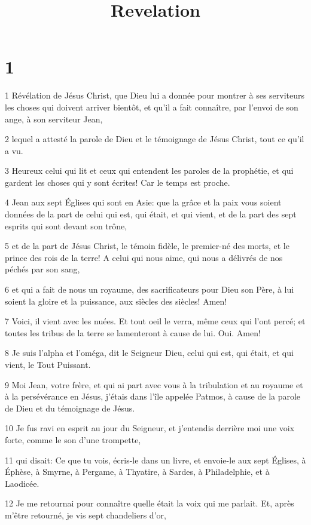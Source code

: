

\title{Revelation}


\chapter{1}

\par 1 Révélation de Jésus Christ, que Dieu lui a donnée pour montrer à ses serviteurs les choses qui doivent arriver bientôt, et qu'il a fait connaître, par l'envoi de son ange, à son serviteur Jean,
\par 2 lequel a attesté la parole de Dieu et le témoignage de Jésus Christ, tout ce qu'il a vu.
\par 3 Heureux celui qui lit et ceux qui entendent les paroles de la prophétie, et qui gardent les choses qui y sont écrites! Car le temps est proche.
\par 4 Jean aux sept Églises qui sont en Asie: que la grâce et la paix vous soient données de la part de celui qui est, qui était, et qui vient, et de la part des sept esprits qui sont devant son trône,
\par 5 et de la part de Jésus Christ, le témoin fidèle, le premier-né des morts, et le prince des rois de la terre! A celui qui nous aime, qui nous a délivrés de nos péchés par son sang,
\par 6 et qui a fait de nous un royaume, des sacrificateurs pour Dieu son Père, à lui soient la gloire et la puissance, aux siècles des siècles! Amen!
\par 7 Voici, il vient avec les nuées. Et tout oeil le verra, même ceux qui l'ont percé; et toutes les tribus de la terre se lamenteront à cause de lui. Oui. Amen!
\par 8 Je suis l'alpha et l'oméga, dit le Seigneur Dieu, celui qui est, qui était, et qui vient, le Tout Puissant.
\par 9 Moi Jean, votre frère, et qui ai part avec vous à la tribulation et au royaume et à la persévérance en Jésus, j'étais dans l'île appelée Patmos, à cause de la parole de Dieu et du témoignage de Jésus.
\par 10 Je fus ravi en esprit au jour du Seigneur, et j'entendis derrière moi une voix forte, comme le son d'une trompette,
\par 11 qui disait: Ce que tu vois, écris-le dans un livre, et envoie-le aux sept Églises, à Éphèse, à Smyrne, à Pergame, à Thyatire, à Sardes, à Philadelphie, et à Laodicée.
\par 12 Je me retournai pour connaître quelle était la voix qui me parlait. Et, après m'être retourné, je vis sept chandeliers d'or,
